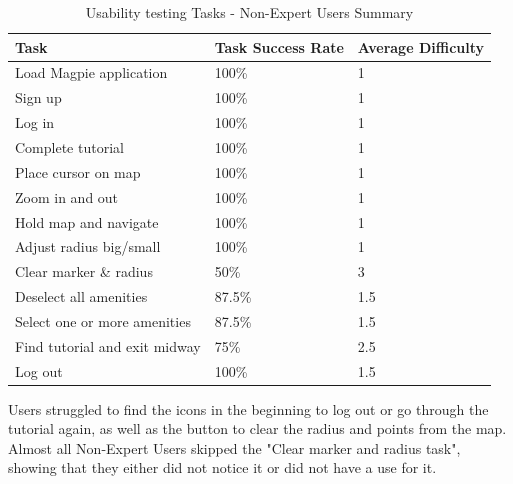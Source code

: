 \begin{table}[h!]
    \centering
    \caption{Usability testing Tasks - Non-Expert Users Summary}
    \begin{tabular}{|p{}|p{}|p{}|}
        \hline
        \textbf{Task}                 & \textbf{Task Success Rate} & \textbf{Average Difficulty} \\
        \hline
        Load Magpie application       & 100\%                      & 1                           \\
        \hline
        Sign up                       & 100\%                      & 1                           \\
        \hline
        Log in                        & 100\%                      & 1                           \\
        \hline
        Complete tutorial             & 100\%                      & 1                           \\
        \hline
        Place cursor on map           & 100\%                      & 1                           \\
        \hline
        Zoom in and out               & 100\%                      & 1                           \\
        \hline
        Hold map and navigate         & 100\%                      & 1                           \\
        \hline
        Adjust radius big/small       & 100\%                      & 1                           \\
        \hline
        Clear marker \& radius        & 50\%                       & 3                           \\
        \hline
        Deselect all amenities        & 87.5\%                     & 1.5                         \\
        \hline
        Select one or more amenities  & 87.5\%                     & 1.5                         \\
        \hline
        Find tutorial and exit midway & 75\%                       & 2.5                         \\
        \hline
        Log out                       & 100\%                      & 1.5                         \\
        \hline
    \end{tabular}
\end{table}

Users struggled to find the icons in the beginning to log out or go through the
tutorial again, as well as the button to clear the radius and points from the
map. Almost all Non-Expert Users skipped the "Clear marker and radius task",
showing that they either did not notice it or did not have a use for it.

